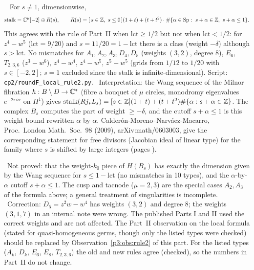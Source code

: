 \begin{obs}\tV\ \tC\label{p3:obs:rule2}
For $s\ne1$, dimensionwise,
\[\text{stalk}=\C^\mu[-2]\oplus R(s),\qquad R(s)=[\,s\in\Z,\ s\le0\,](1+t)+(t+t^2)\cdot\#\{\alpha\in\mathrm{Sp}:\ s+\alpha\in\Z,\ s+\alpha\le1\}.\]
This agrees with the rule of Part~II when $\mathrm{lct}\ge1/2$ but not when $\mathrm{lct}<1/2$: for $z^4-w^5$ ($\mathrm{lct}=9/20$) and $s=11/20=1-\mathrm{lct}$ there is a class (weight $-\delta$) although $s>\mathrm{lct}$. No mismatches for $A_1,A_2,A_3,D_4,D_5$ (weights $(3,2)$, degree 8), $E_6$, $T_{2,3,6}$ ($z^3-w^6$), $z^4-w^4$, $z^4-w^5$, $z^5-w^5$ (grids from $1/12$ to $1/20$ with $s\in[-2,2]$; $s=1$ excluded since the stalk is infinite-dimensional). Script: \texttt{cp2/roundF\_local\_rule2.py}. \tC\ Interpretation: the Wang sequence of the Milnor fibration $h:B\setminus D\to\mathbb C^*$ (fibre a bouquet of $\mu$ circles, monodromy eigenvalues $e^{-2\pi i\alpha}$ on $H^1$) gives $\text{stalk}(Rj_*L_s)=[s\in\mathbb Z](1+t)+(t+t^2)\#\{\alpha:s+\alpha\in\mathbb Z\}$. The complex $B_s$ computes the part of weight $\ge-\delta$, and the cutoff $s+\alpha\le1$ is this weight bound rewritten $\alpha$ by $\alpha$. Calder\'on-Moreno--Narv\'aez-Macarro, Proc.\ London Math.\ Soc.\ 98 (2009), arXiv:math/0603003, give the corresponding statement for free divisors (Jacobian ideal of linear type) for the family where $s$ is shifted by large integers (pages \tQ).
\end{obs}
\noindent \tK\ Not proved: that the weight-$k_0$ piece of $H(B_s)$ has exactly the dimension given by the Wang sequence for $s\le1-\mathrm{lct}$ (no mismatches in 10 types), and the $\alpha$-by-$\alpha$ cutoff $s+\alpha\le1$. The cusp and tacnode ($\mu=2,3$) are the special cases $A_2,A_3$ of the formula above; a general treatment of singularities is incomplete.\\
\tP\ Correction: $D_5=z^2w-w^4$ has weights $(3,2)$ and degree 8; the weights $(3,1,7)$ in an internal note were wrong. The published Parts I and II used the correct weights and are not affected. The Part~II observation on the local formula (stated for quasi-homogeneous germs, though only the listed types were checked) should be replaced by Observation~\ref{p3:obs:rule2} of this part. For the listed types ($A_k$, $D_k$, $E_6$, $E_8$, $T_{2,3,6}$) the old and new rules agree (checked), so the numbers in Part~II do not change.

